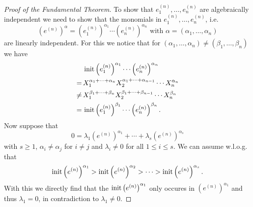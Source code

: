 \begin{proof}[Proof of the Fundamental Theorem]
 To show that $e^{(n)}_1, \dotsc, e^{(n)}_n$ are algebraically independent we need to show that the monomials in $e^{(n)}_1, \dotsc, e^{(n)}_n$, i.e.
 \[
  \left(e^{(n)}\right)^\alpha = \left(e^{(n)}_1\right)^{\alpha_1} \dotsm \left(e^{(n)}_n\right)^{\alpha_n} \text{ with } \alpha = (\alpha_1, \dotsc, \alpha_n)
 \]
 are linearly independent. For this we notice that for $(\alpha_1, \dotsc, \alpha_n) \neq (\beta_1, \dotsc, \beta_n)$ we have
 \begin{align*}
      &\, \operatorname{init} \left(e^{(n)}_1\right)^{\alpha_1} \dotsm \left(e^{(n)}_n\right)^{\alpha_n} \\
     =&\, X_1^{\alpha_1 + \dotsb + \alpha_n} X_2^{\alpha_1 + \dotsb + \alpha_{n-1}} \dotsm X_n^{\alpha_n} \\
  \neq&\, X_1^{\beta_1 + \dotsb + \beta_n} X_2^{\beta_1 + \dotsb + \beta_{n-1}} \dotsm X_n^{\beta_n} \\
     =&\, \operatorname{init} \left(e^{(n)}_1\right)^{\beta_1} \dotsm \left(e^{(n)}_n\right)^{\beta_n}.
 \end{align*}
 Now suppose that
 \[
  0 = \lambda_1 \left(e^{(n)}\right)^{\alpha_1} + \dotsb + \lambda_s \left(e^{(n)}\right)^{\alpha_s}
 \]
 with $s \geq 1$, $\alpha_i \neq \alpha_j$ for $i \neq j$ and $\lambda_i \neq 0$ for all $1 \leq i \leq s$. We can assume w.l.o.g. that 
 \[
  \operatorname{init} \left(e^{(n)}\right)^{\alpha_1} > \operatorname{init} \left(e^{(n)}\right)^{\alpha_2} > \dotsb > \operatorname{init} \left(e^{(n)}\right)^{\alpha_s}.
 \]
 With this we directly find that the $\operatorname{init} \left(e^{(n)}\right)^{\alpha_1}$ only occures in $\left(e^{(n)}\right)^{\alpha_1}$ and thus $\lambda_1 = 0$, in contradiction to $\lambda_1 \neq 0$.
\end{proof}


